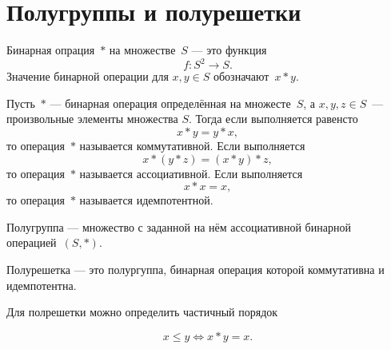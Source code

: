 \chapter{Полугруппы и полурешетки}

\begin{my_def}
Бинарная опрация~$*$ на множестве~$S$ --- это функция
$$f: S^2 \rightarrow S.$$
Значение бинарной операции для $x, y \in S$ обозначают~$x * y$.
\end{my_def}


\begin{my_def}
Пусть~$*$ --- бинарная операция определённая на множесте~$S$, а
$x, y, z \in S$~--- произвольные элементы множества $S$. Тогда если
выполняется равенсто
$$x * y = y * x,$$
то операция~$*$ называется коммутативной.
Если выполняется
$$
x * (y * z) = (x * y) * z,
$$
то операция~$*$ называется ассоциативной.
Если выполняется
$$
x * x = x,
$$
то операция~$*$ называется идемпотентной.
\end{my_def}


\begin{my_def}
Полугруппа --- множество с заданной на нём ассоциативной бинарной операцией~$(S,*)$.
\end{my_def}


\begin{my_def}
Полурешетка --- это полургуппа, бинарная операция которой коммутативна и
идемпотентна.
\end{my_def}

Для полрешетки можно определить частичный порядок

$$x \leq y \Leftrightarrow x*y=x.$$
